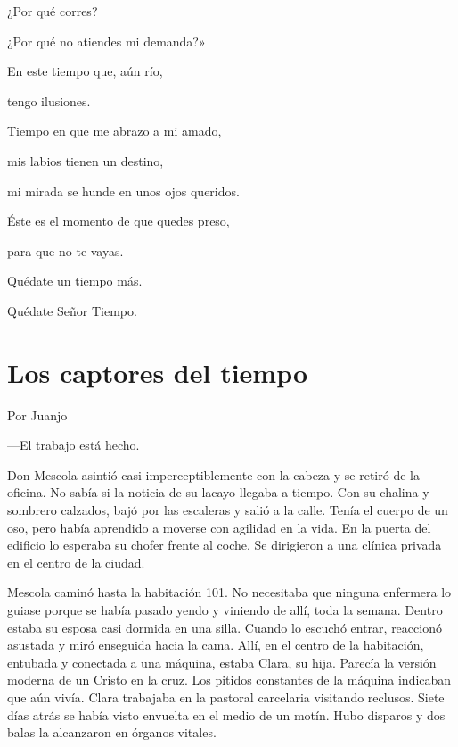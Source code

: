 \documentclass[11pt,twoside,openright,a5paper]{book}
\begin{document}
\begin{center}
¿Por qué corres?

¿Por qué no atiendes mi demanda?»
 
En este tiempo que, aún río, 

tengo ilusiones.

Tiempo en que me abrazo a mi amado,

mis labios tienen un destino,

mi mirada se hunde en unos ojos queridos.

Éste es el momento de que quedes preso,

para que no te vayas.

Quédate un tiempo más.

Quédate Señor Tiempo.
\end{center}


\section*{Los captores del tiempo}

                                                                               \begin{flushright}Por Juanjo\end{flushright}

---El trabajo está hecho.

Don Mescola asintió casi imperceptiblemente con la cabeza y se retiró de la oficina. No sabía si la noticia de su lacayo llegaba a tiempo. Con su chalina y sombrero calzados, bajó por las escaleras y salió a la calle. Tenía el cuerpo de un oso, pero había aprendido a moverse con agilidad en la vida. En la puerta del edificio lo esperaba su chofer frente al coche. Se dirigieron a una clínica privada en el centro de la ciudad.

Mescola caminó hasta la habitación 101. No necesitaba que ninguna enfermera lo guiase porque se había pasado yendo y viniendo de allí, toda la semana. Dentro estaba su esposa casi dormida en una silla. Cuando lo escuchó entrar, reaccionó asustada y miró enseguida hacia la cama. Allí, en el centro de la habitación, entubada y conectada a una máquina, estaba Clara, su hija. Parecía la versión moderna de un Cristo en la cruz. Los pitidos constantes de la máquina indicaban que aún vivía. Clara trabajaba en la pastoral carcelaria visitando reclusos. Siete días atrás se había visto envuelta en el medio de un motín. Hubo disparos y dos balas la alcanzaron en órganos vitales.
\end{document}
